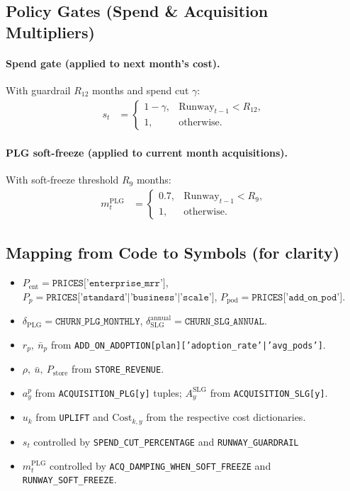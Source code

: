 \documentclass[11pt, a4paper, oneside]{article}
\begin{document}
\subsection{Policy Gates (Spend \& Acquisition Multipliers)}
\paragraph{Spend gate (applied to next month’s cost).}
With guardrail $R_{12}$ months and spend cut $\gamma$:
\begin{align}
s_t 
  &= 
  \begin{cases}
    1-\gamma, & \mathrm{Runway}_{t-1} < R_{12},\\
    1, & \text{otherwise.}
  \end{cases}
\end{align}

\paragraph{PLG soft-freeze (applied to current month acquisitions).}
With soft-freeze threshold $R_{9}$ months:
\begin{align}
m^{\mathrm{PLG}}_t 
  &= 
  \begin{cases}
    0.7, & \mathrm{Runway}_{t-1} < R_{9},\\
    1, & \text{otherwise.}
  \end{cases}
\end{align}

\subsection{Mapping from Code to Symbols (for clarity)}
\begin{itemize}
  \item $P_{\mathrm{ent}} = \texttt{PRICES['enterprise\_mrr']}$, $P_p=\texttt{PRICES['standard'|'business'|'scale']}$, $P_{\mathrm{pod}}=\texttt{PRICES['add\_on\_pod']}$.
  \item $\delta_{\mathrm{PLG}}=\texttt{CHURN\_PLG\_MONTHLY}$, $\delta^{\mathrm{annual}}_{\mathrm{SLG}}=\texttt{CHURN\_SLG\_ANNUAL}$.
  \item $r_p,\ \bar{n}_p$ from \texttt{ADD\_ON\_ADOPTION[plan]['adoption\_rate'|'avg\_pods']}.
  \item $\rho,\ \bar{u},\ P_{\mathrm{store}}$ from \texttt{STORE\_REVENUE}.
  \item $a^p_y$ from \texttt{ACQUISITION\_PLG[y]} tuples; $A^{\mathrm{SLG}}_y$ from \texttt{ACQUISITION\_SLG[y]}.
  \item $u_k$ from \texttt{UPLIFT} and $\mathrm{Cost}_{k,y}$ from the respective cost dictionaries.
  \item $s_t$ controlled by \texttt{SPEND\_CUT\_PERCENTAGE} and \texttt{RUNWAY\_GUARDRAIL}
  \item $m^{\mathrm{PLG}}_t$ controlled by \texttt{ACQ\_DAMPING\_WHEN\_SOFT\_FREEZE} and \texttt{RUNWAY\_SOFT\_FREEZE}.
\end{itemize}
\end{document}
